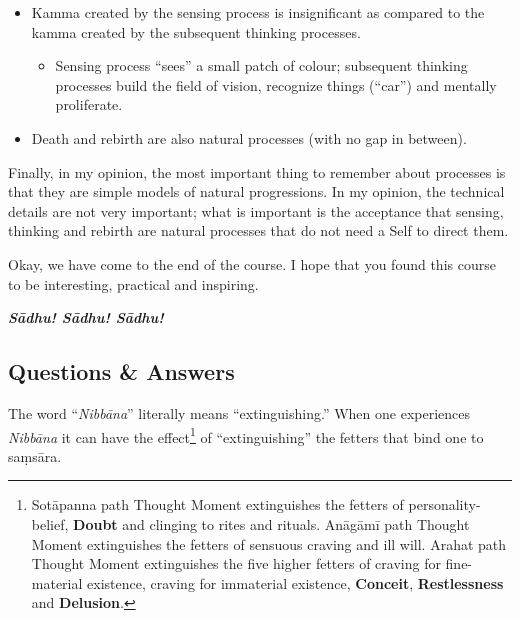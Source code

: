 \begin{itemize}
\item Kamma created by the sensing process is insignificant as compared to the kamma created by the subsequent thinking processes.

\begin{itemize}

\item Sensing process “sees” a small patch of colour; subsequent thinking processes build the field of vision, recognize things (“car”) and mentally proliferate.

\end{itemize}

\item Death and rebirth are also natural processes (with no gap in between).

\end{itemize}

Finally, in my opinion, the most important thing to remember about processes is that they are simple models of natural progressions. In my opinion, the technical details are not very important; what is important is the acceptance that sensing, thinking and rebirth are natural processes that do not need a Self to direct them.

Okay, we have come to the end of the course. I hope that you found this course to be interesting, practical and inspiring.

\begin{center}
\textbf{\textit{Sādhu! Sādhu! Sādhu!}} \\
\end{center}

\newpage

\subsection*{Questions \& Answers}


The word “\textit{Nibbāna}” literally means “extinguishing.” When one experiences \textit{Nibbāna} it can have the effect\footnote{Sotāpanna path Thought Moment extinguishes the fetters of personality-belief, \textbf{Doubt} and clinging to rites and rituals. Anāgāmī path Thought Moment extinguishes the fetters of sensuous craving and ill will. Arahat path Thought Moment extinguishes the five higher fetters of craving for fine-material existence, craving for immaterial existence, \textbf{Conceit}, \textbf{Restlessness} and \textbf{Delusion}.} of “extinguishing” the fetters that bind one to saṃsāra.

